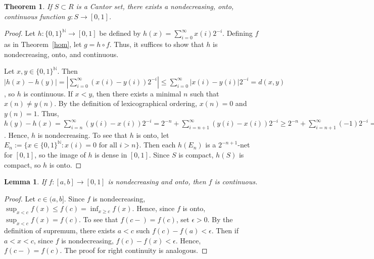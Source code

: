 \documentclass{article}
\newtheorem{theorem}{Theorem}
\newtheorem{lemma}{Lemma}
\newcommand{\N}{\mathbb{N}}
\begin{document}
\begin{theorem}\label{cfunction}
If $S \subset R$ is a Cantor set, there exists a nondecreasing, onto, continuous function $g:S \rightarrow [0,1]$.
\end{theorem}
\begin{proof}
Let $h:{\{0,1\}}^\N \rightarrow [0,1]$ be defined by $h(x) = \sum_{i=0}^\infty x(i)2^{-i}$. Defining $f$ as in Theorem~\ref{hom}, let $g = h \circ f$. Thus, it suffices to show that $h$ is nondecreasing, onto, and continuous.

Let $x,y \in {\{0,1\}}^\N$. Then $|h(x) - h(y)| = |\sum_{i=0}^\infty (x(i)-y(i))2^{-i}| \leq \sum_{i=0}^\infty |x(i)-y(i)|2^{-i} = d(x,y)$, so $h$ is continuous. If $x<y$, then there exists a minimal $n$ such that $x(n) \neq y(n)$. By the definition of lexicographical ordering, $x(n) = 0$ and $y(n) = 1$.  Thus, $h(y) - h(x) = \sum_{i=n}^\infty (y(i)-x(i))2^{-i} = 2^{-n} + \sum_{i=n+1}^\infty (y(i)-x(i))2^{-i} \geq 2^{-n} + \sum_{i=n+1}^\infty (-1)2^{-i} = 0$. Hence, $h$ is nondecreasing. To see that $h$ is onto, let $E_n := \{x \in {\{0,1\}}^\N : x(i) = 0 \text{ for all } i>n\}$. Then each $h(E_n)$ is a $2^{-n+1}$-net for $[0,1]$, so the image of $h$ is dense in $[0,1]$.  Since $S$ is compact, $h(S)$ is compact, so $h$ is onto.
\end{proof}



\begin{lemma}\label{continuous}
If $f:[a,b] \rightarrow [0,1]$ is nondecreasing and onto, then $f$ is continuous.
\end{lemma}
\begin{proof}
Let $c \in (a,b]$.  Since $f$ is nondecreasing, $\sup_{x < c} {f(x)} \leq f(c) = \inf_{x \geq c} {f(x)}$. Hence, since $f$ is onto, $\sup_{x < c} {f(x)} = f(c)$.
To see that $f(c-) = f(c)$, set $\epsilon > 0$. By the definition of supremum, there exists $a<c$ such $f(c) - f(a) < \epsilon$. Then if $a<x<c$, since $f$ is nondecreasing, 
$f(c) - f(x) < \epsilon$. Hence, $f(c-) = f(c)$.  The proof for right continuity is analogous.
\end{proof}
\end{document}
